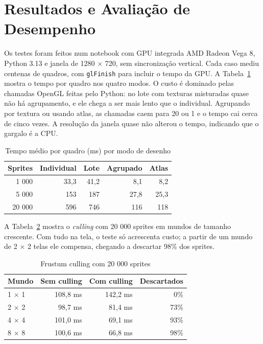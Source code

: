 \documentclass[conference]{IEEEtran}
\begin{document}
\section{Resultados e Avaliação de Desempenho}
Os testes foram feitos num notebook com GPU integrada AMD Radeon Vega 8, Python 3.13 e janela de 1280 $\times$ 720, sem sincronização vertical. Cada caso mediu centenas de quadros, com \texttt{glFinish} para incluir o tempo da GPU.
A Tabela~\ref{tab:modos} mostra o tempo por quadro nos quatro modos. O custo é dominado pelas chamadas OpenGL feitas pelo Python: no lote com texturas misturadas quase não há agrupamento, e ele chega a ser mais lento que o individual. Agrupando por textura ou usando atlas, as chamadas caem para 20 ou 1 e o tempo cai cerca de cinco vezes. A resolução da janela quase não alterou o tempo, indicando que o gargalo é a CPU.
\begin{table}[htbp]
\caption{Tempo médio por quadro (ms) por modo de desenho}
\begin{center}
\begin{tabular}{rrrrr}
\toprule
Sprites & Individual & Lote & Agrupado & Atlas \\
\midrule
1 000 & 33,3 & 41,2 & 8,1 & 8,2 \\
5 000 & 153 & 187 & 27,8 & 25,3 \\
20 000 & 596 & 746 & 116 & 118 \\
\bottomrule
\end{tabular}
\label{tab:modos}
\end{center}
\end{table}
A Tabela~\ref{tab:culling} mostra o \textit{culling} com 20 000 sprites em mundos de tamanho crescente. Com tudo na tela, o teste só acrescenta custo; a partir de um mundo de 2 $\times$ 2 telas ele compensa, chegando a descartar 98\% dos sprites.
\begin{table}[htbp]
\caption{Frustum culling com 20 000 sprites}
\begin{center}
\begin{tabular}{lrrr}
\toprule
Mundo & Sem culling & Com culling & Descartados \\
\midrule
1 $\times$ 1 & 108,8 ms & 142,2 ms & 0\% \\
2 $\times$ 2 & 98,7 ms & 81,4 ms & 73\% \\
4 $\times$ 4 & 101,0 ms & 69,1 ms & 93\% \\
8 $\times$ 8 & 100,6 ms & 66,8 ms & 98\% \\
\bottomrule
\end{tabular}
\label{tab:culling}
\end{center}
\end{table}
\end{document}
